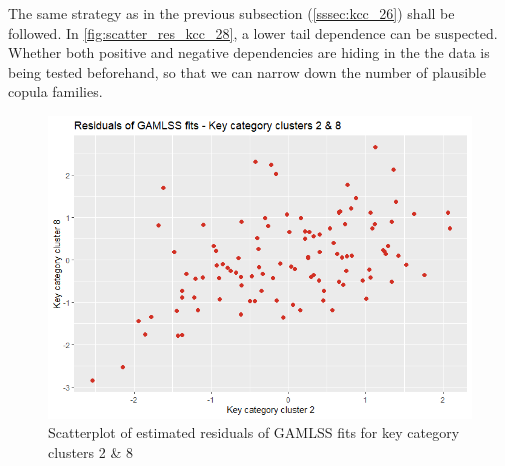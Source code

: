 
The same strategy as in the previous subsection (\ref{sssec:kcc_26}) shall be followed. In \autoref{fig:scatter_res_kcc_28}, a lower tail dependence can be suspected. Whether both positive and negative dependencies are hiding in the the data is being tested beforehand, so that we can narrow down the number of plausible copula families.
\\

\begin{figure}[H]
\centering
  \includegraphics[width=0.45\linewidth]{figures/scatter_res_kcc_28.png}
  \caption{Scatterplot of estimated residuals of GAMLSS fits for key category clusters 2 \& 8}
  \label{fig:scatter_res_kcc_28}
\end{figure}


